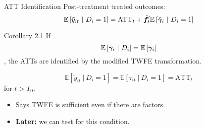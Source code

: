 \documentclass{beamer}
\newcommand{\1}{\mathds{1}} %
\newcommand{\condexpec}[2]{\mathbb{E}\left[#1 \ \vert \ #2\right]}
\begin{document}

\begin{frame}{ATT Identification}
Post-treatment treated outcomes:
\begin{equation}
    \condexpec{\Tilde{y}_{it}}{D_i = 1} = \text{ATT}_t + \Tilde{\bm f}_t' \condexpec{\tilde{\bm \gamma}_i}{D_i = 1}
\end{equation}

    \begin{block}{Corollary 2.1}
        If
        \begin{equation*}
            \condexpec{\bm \gamma_i}{D_i} = \expec{\bm \gamma_i}
        \end{equation*}, the ATTs are identified by the modified TWFE transformation.
    \end{block}
    \begin{equation}
        \condexpec{\tilde{y}_{it}}{D_i = 1} = \condexpec{\tau_{it}}{D_i = 1} = \text{ATT}_t
    \end{equation}
    for $t > T_0$.

    \begin{itemize}
        \item Says TWFE is sufficient even if there are factors. 
        \item \textbf{Later:} we can test for this condition.
    \end{itemize}
\end{frame}


\end{document}
